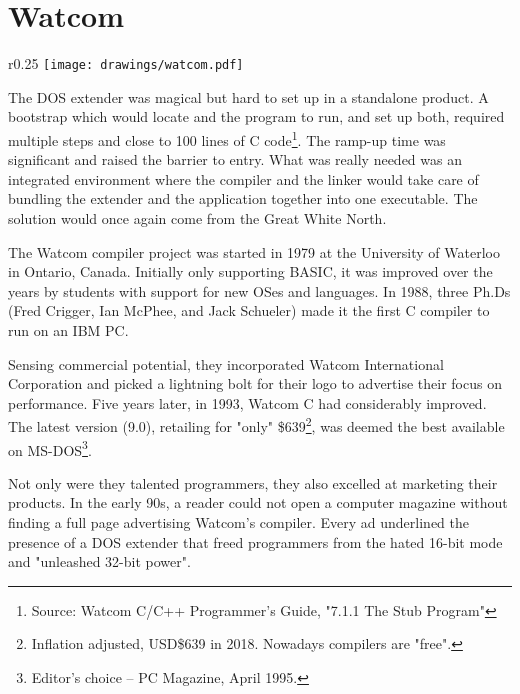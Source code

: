 \section{Watcom}

\begin{wrapfigure}[9]{r}{0.25\textwidth}
\centering
\texttt{[image: drawings/watcom.pdf]}
\end{wrapfigure}


The DOS extender was magical but hard to set up in a standalone product. A bootstrap which would locate  and the program to run, and set up both, required multiple steps and close to 100 lines of C code\footnote{Source: Watcom C/C++ Programmer's Guide, "7.1.1 The Stub Program"}. The ramp-up time was significant and raised the barrier to entry. What was really needed was an integrated environment where the compiler and the linker would take care of bundling the extender and the application together into one executable. The solution would once again come from the Great White North.\\ 
\par

The Watcom compiler project was started in 1979 at the University of Waterloo in Ontario, Canada. Initially only supporting BASIC, it was improved over the years by students with support for new OSes and languages. In 1988, three Ph.Ds (Fred Crigger, Ian McPhee, and Jack Schueler) made it the first C compiler to run on an IBM PC.\\
\par
Sensing commercial potential, they incorporated Watcom International Corporation and picked a lightning bolt for their logo to advertise their focus on performance. Five years later, in 1993, Watcom C had considerably improved. The latest version (9.0), retailing for "only" \$639\footnote{Inflation adjusted, USD\$639 in 2018. Nowadays compilers are "free".}, was deemed the best available on MS-DOS\footnote{Editor's choice -- PC Magazine, April 1995.}. \\
\par
Not only were they talented programmers, they also excelled at marketing their products. In the early 90s, a reader could not open a computer magazine without finding a full page advertising Watcom's compiler. Every ad underlined the presence of a DOS extender that freed programmers from the hated 16-bit mode and "unleashed 32-bit power".
\par
\label{watcomad}



